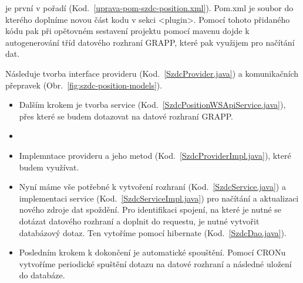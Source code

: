 je první v pořadí (Kod.~\ref{uprava-pom-szdc-position.xml}). Pom.xml je soubor do kterého doplníme novou část kodu v sekci <plugin>. Pomocí tohoto přidaného kódu pak při opětovném sestavení projektu pomocí mavenu dojde k autogenerování tříd datového rozhraní GRAPP, které pak využijem pro načítání dat.


Následuje tvorba interface provideru (Kod.~\ref{SzdcProvider.java}) a komunikačních přepravek (Obr.~\ref{fig:szdc-position-models}).
 	
\begin{itemize}
 	\setlength{\parskip}{0pt}
 	\setlength{\itemsep}{0pt}


 
	\item Dalším krokem je tvorba service (Kod.~\ref{SzdcPositionWSApiService.java}), přes které se budem dotazovat na datové rozhraní GRAPP.
 
 
	\item 
 
	\item Implemntace provideru a jeho metod (Kod.~\ref{SzdcProviderImpl.java}), které budem využívat.
 
 
	\item Nyní máme vše potřebné k vytvoření rozhraní (Kod.~\ref{SzdcService.java}) a implementaci service (Kod.~\ref{SzdcServiceImpl.java}) pro načítání a aktualizaci nového zdroje dat spoždění. Pro identifikaci spojení, na které je nutné se dotázat datového rozhraní a doplnit do requestu, je nutné vytvořit databázový dotaz. Ten vytoříme pomocí hibernate (Kod.~\ref{SzdcDao.java}).
	
	
	\item Posledním krokem k dokončení je automatické spouštění. Pomocí CRONu vytvoříme periodické spuštění dotazu na datové rozhraní a následné uložení do databáze.
	
\end{itemize} 

